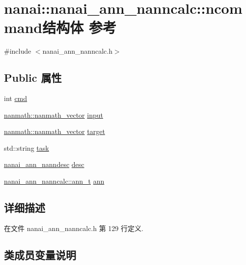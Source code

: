 \hypertarget{structnanai_1_1nanai__ann__nanncalc_1_1ncommand}{}\section{nanai\+:\+:nanai\+\_\+ann\+\_\+nanncalc\+:\+:ncommand结构体 参考}
\label{structnanai_1_1nanai__ann__nanncalc_1_1ncommand}


{\ttfamily \#include $<$nanai\+\_\+ann\+\_\+nanncalc.\+h$>$}

\subsection*{Public 属性}
\begin{DoxyCompactItemize}
\item 
int \hyperlink{structnanai_1_1nanai__ann__nanncalc_1_1ncommand_a4a61797e6f5a657c50a34a5fb3abda56}{cmd}
\item 
\hyperlink{classnanmath_1_1nanmath__vector}{nanmath\+::nanmath\+\_\+vector} \hyperlink{structnanai_1_1nanai__ann__nanncalc_1_1ncommand_acb609b08ab6f835678886dfeec79da71}{input}
\item 
\hyperlink{classnanmath_1_1nanmath__vector}{nanmath\+::nanmath\+\_\+vector} \hyperlink{structnanai_1_1nanai__ann__nanncalc_1_1ncommand_afd7d33dcebc41d012eeef46b346e9854}{target}
\item 
std\+::string \hyperlink{structnanai_1_1nanai__ann__nanncalc_1_1ncommand_a2355346d40218889f8de46778110deec}{task}
\item 
\hyperlink{namespacenanai_a892a8c80381d0005a076b68fbbf2d918}{nanai\+\_\+ann\+\_\+nanndesc} \hyperlink{structnanai_1_1nanai__ann__nanncalc_1_1ncommand_ad5b646ce90221dc90cc161b8293ba0eb}{desc}
\item 
\hyperlink{classnanai_1_1nanai__ann__nanncalc_1_1ann__t}{nanai\+\_\+ann\+\_\+nanncalc\+::ann\+\_\+t} \hyperlink{structnanai_1_1nanai__ann__nanncalc_1_1ncommand_a64d0d3494fb258a2d7dc7770b7a1da96}{ann}
\end{DoxyCompactItemize}


\subsection{详细描述}


在文件 nanai\+\_\+ann\+\_\+nanncalc.\+h 第 129 行定义.



\subsection{类成员变量说明}
\hypertarget{structnanai_1_1nanai__ann__nanncalc_1_1ncommand_a64d0d3494fb258a2d7dc7770b7a1da96}{}
